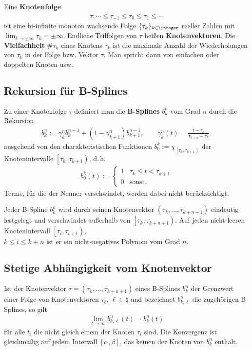 Eine \textbf{Knotenfolge}
\begin{align*}
    \tau\colon \dotsb \le \tau_{-1} \le \tau_0 \le \tau_1 \le \dotsb
\end{align*}
ist eine bi-infinite monoton wachsende Folge $\{\tau_k\}_{k \in \integer}$
reeller Zahlen mit $\lim_{k \to \pm\infty} \tau_k = \pm\infty$.
Endliche Teilfolgen von $\tau$ heißen \textbf{Knotenvektoren}.
Die \textbf{Vielfachheit} $\#\tau_k$ eines Knotens $\tau_k$ ist die
maximale Anzahl der Wiederholungen von $\tau_k$ in der Folge bzw.
Vektor $\tau$.
Man spricht dann von einfachen oder doppelten Knoten usw.

\subsection{%
    Rekursion für B-Splines%
}

Zu einer Knotenfolge $\tau$ definiert man die \textbf{B-Splines} $b_k^n$
vom Grad $n$ durch die Rekursion
\begin{align*}
    b_k^n := \gamma_k^n b_k^{n-1} + (1 - \gamma_{k+1}^n)b_{k+1}^{n-1}, \qquad
    \gamma_k^n(t) = \frac{t - \tau_k}{\tau_{k+n} - \tau_k},
\end{align*}
ausgehend von den charakteristischen Funktionen
$b_0^k := \chi_{\left[\tau_k, \tau_{k+1}\right)}$ der Knotenintervalle
$\left[\tau_k, \tau_{k+1}\right)$, d.\,h.
\begin{align*}
    b_0^k(t) := \begin{cases}1 & \tau_k \le t < \tau_{k+1} \\
    0 & \text{sonst}.\end{cases}
\end{align*}
Terme, für die der Nenner verschwindet, werden dabei nicht berücksichtigt.

\linie

Jeder B-Spline $b_k^n$ wird durch seinen Knotenvektor
$(\tau_k, \dotsc, \tau_{k+n+1})$ eindeutig festgelegt und verschwindet
außerhalb von $\left[\tau_k, \tau_{k+n+1}\right)$.
Auf jeden nicht-leeren Knotenintervall $\left[\tau_i, \tau_{i+1}\right)$, \\
$k \le i \le k + n$ ist er ein nicht-negatives Polynom vom Grad $n$.

\subsection{%
    Stetige Abhängigkeit vom Knotenvektor%
}

Ist der Knotenvektor $\tau = (\tau_k, \dotsc, \tau_{k+n+1})$ eines B-Splines
$b_k^n$ der Grenzwert einer Folge von Knotenvektoren $\tau_\ell$,
$\ell \in \natural$ und bezeichnet $b_{k,\ell}^n$ die zugehörigen B-Splines,
so gilt
\begin{align*}
    \lim_{t \to \infty} b_{k,\ell}^n(t) = b_k^n(t)
\end{align*}
für alle $t$, die nicht gleich einem der Knoten $\tau_i$ sind.
Die Konvergenz ist gleichmäßig auf jedem Intervall $[\alpha, \beta]$,
das keinen der Knoten von $b_k^n$ enthält.

